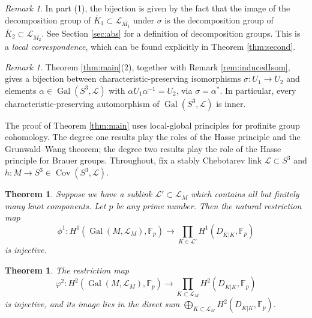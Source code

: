 \documentclass{amsart}
\theoremstyle{plain}
\theoremstyle{definition}
\theoremstyle{plain}
\theoremstyle{plain}
\theoremstyle{plain}
\theoremstyle{remark}
\newtheorem{remark}[theorem]{Remark}
\theoremstyle{remark}
\theoremstyle{plain}
\theoremstyle{definition}
\theoremstyle{plain}
\DeclareMathOperator{\Gal}{\mathrm{Gal}}
\DeclareMathOperator{\Cov}{\mathrm{Cov}}
\newcounter{main}
\theoremstyle{plain}
\newtheorem{mainthm}[main]{\textbf{Theorem}}
\theoremstyle{plain}
\numberwithin{equation}{section}
\begin{document}
\begin{remark}
In part (1), the bijection is given by the fact that the image of the decomposition group of $\bar{K}_1 \subset \mathcal L_{\overline{M_1}}$ under $\sigma$ is the decomposition group of $\bar K_2 \subset \mathcal L_{\overline{M_2}}$. See Section \ref{sec:abs} for a definition of decomposition groups. This is a \emph{local correspondence}, which can be found explicitly in Theorem \ref{thm:second}.
\end{remark}

\begin{remark}
Theorem \ref{thm:main}(2), together with Remark \ref{rem:inducedIsom}, gives a bijection between characteristic-preserving isomorphisms $\sigma: U_1 \to U_2$ and elements $\alpha \in \Gal(S^3, \mathcal L)$ with $\alpha U_1\alpha^{-1} = U_2$, via $\sigma = \alpha^*$. In particular, every characteristic-preserving automorphism of $\Gal(S^3, \mathcal{L})$ is inner.
\end{remark}

The proof of Theorem \ref{thm:main} uses local-global principles for profinite group cohomology. The degree one results play the roles of the Hasse principle and the Grunwald--Wang theorem; the degree two results play the role of the Hasse principle for Brauer groups. Throughout, fix a stably Chebotarev link $\mathcal L \subset S^3$ and $h: M \to S^3 \in \Cov(S^3, \mathcal L)$.

\begin{mainthm}\label{thm:maininjective}
Suppose we have a sublink $\mathcal{L}' \subset \mathcal{L}_M$ which contains all but finitely many knot components. Let $p$ be any prime number. Then the natural restriction map
\begin{equation}
    \phi^1: H^1(\Gal(M, \mathcal{L}_M), \mathbb{F}_p) \to \prod_{K \in \mathcal{L}'}H^1(D_{\overline{K}|K}, \mathbb{F}_p)
\end{equation}
is injective.
\end{mainthm}

\begin{mainthm}\label{thm:maininjective2}
The restriction map
\begin{equation}
    \varphi^2: H^2(\Gal(M, \mathcal L_M), \mathbb F_p) \to \prod_{K \subset \mathcal L_M}H^2(D_{\overline K|K}, \mathbb F_p)
\end{equation}
is injective, and its image lies in the direct sum $\bigoplus_{K \subset \mathcal L_M}H^2(D_{\overline K|K}, \mathbb F_p)$. 
\end{mainthm}
\end{document}
